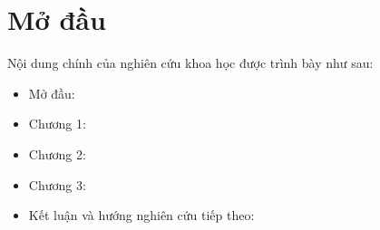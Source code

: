 \clearpage
{}

\chapter*{Mở đầu}
\label{sec:intro}


\vspace{0.5cm}



\vspace{0.5cm}

Nội dung chính của nghiên cứu khoa học được trình bày như sau:

\renewcommand{\labelitemi}{$-$}
\begin{itemize}
	\item Mở đầu: 
	\item Chương 1: 
	\item Chương 2: 
	\item Chương 3: 
	\item Kết luận và hướng nghiên cứu tiếp theo: 
\end{itemize} 